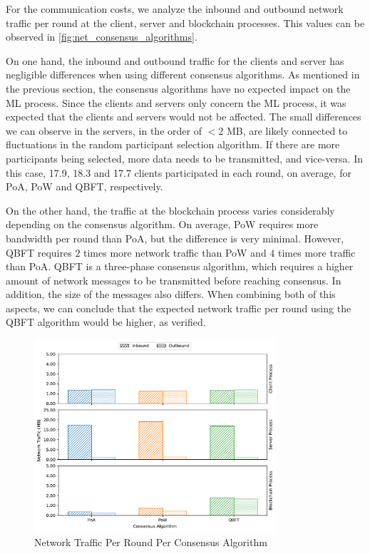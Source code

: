 For the communication costs, we analyze the inbound and outbound network traffic per round at the client, server and blockchain processes. This values can be observed in \autoref{fig:net_consensus_algorithms}.

On one hand, the inbound and outbound traffic for the clients and server has negligible differences when using different consensus algorithms. As mentioned in the previous section, the consensus algorithms have no expected impact on the ML process. Since the clients and servers only concern the ML process, it was expected that the clients and servers would not be affected. The small differences we can observe in the servers, in the order of $< 2$ MB, are likely connected to fluctuations in the random participant selection algorithm. If there are more participants being selected, more data needs to be transmitted, and vice-versa. In this case, 17.9, 18.3 and 17.7 clients participated in each round, on average, for PoA, PoW and QBFT, respectively.

On the other hand, the traffic at the blockchain process varies considerably depending on the consensus algorithm. On average, PoW requires more bandwidth per round than PoA, but the difference is very minimal. However, QBFT requires $2$ times more network traffic than PoW and $4$ times more traffic than PoA. QBFT is a three-phase consensus algorithm, which requires a higher amount of network messages to be transmitted before reaching consensus. In addition, the size of the messages also differs. When combining both of this aspects, we can conclude that the expected network traffic per round using the QBFT algorithm would be higher, as verified.

\begin{figure}[!ht]
    \centering
    \centering
    \includegraphics[width=0.8\textwidth]{graphics/consensus/net.pdf}
    \caption{Network Traffic Per Round Per Consensus Algorithm}
    \label{fig:net_consensus_algorithms}
\end{figure}

